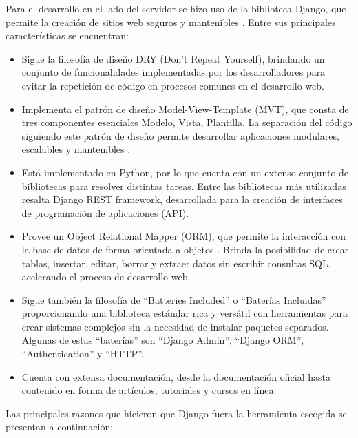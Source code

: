 Para el desarrollo en el lado del servidor se hizo uso de la biblioteca Django, que permite 
la creación de sitios web seguros y mantenibles \cite{django}. Entre sus principales características
se encuentran:


\begin{itemize}
    \item Sigue la filosofía
    de diseño DRY (Don't Repeat Yourself), brindando un conjunto de funcionalidades implementadas
    por los desarrolladores para evitar la repetición de código en procesos
    comunes en el desarrollo web.
    \item Implementa el patrón de diseño Model-View-Template (MVT), que
    consta de tres componentes esenciales Modelo, Vista,
    Plantilla. La separación del código siguiendo este patrón
    de diseño permite desarrollar aplicaciones modulares, escalables y mantenibles \cite{mvc}.
    \item Está implementado en Python, por lo que cuenta con un 
    extenso conjunto de bibliotecas para resolver distintas tareas. Entre
    las bibliotecas más utilizadas resalta Django REST framework, desarrollada 
    para la creación de interfaces de programación de aplicaciones (API).
    \item Provee un Object Relational Mapper (ORM), 
    que permite la interacción con la base de datos
    de forma orientada a objetos \cite{django_orm}. Brinda la posibilidad de crear tablas, insertar,
    editar, borrar y extraer datos sin escribir consultas SQL, acelerando el proceso
    de desarrollo web. 
    \item Sigue también la filosofía de ``Batteries Included'' o ``Baterías Incluidas''
    proporcionando una biblioteca estándar rica y versátil con herramientas para
    crear sistemas complejos sin la necesidad de instalar paquetes separados. Algunas de 
    estas ``baterías'' son ``Django Admin'', ``Django ORM'', ``Authentication'' y
    ``HTTP''.
    \item Cuenta con extensa documentación, desde la documentación oficial hasta 
    contenido en forma de artículos, tutoriales y cursos en línea.
\end{itemize}


Las principales razones que hicieron que Django fuera la herramienta escogida 
se presentan a continuación:

